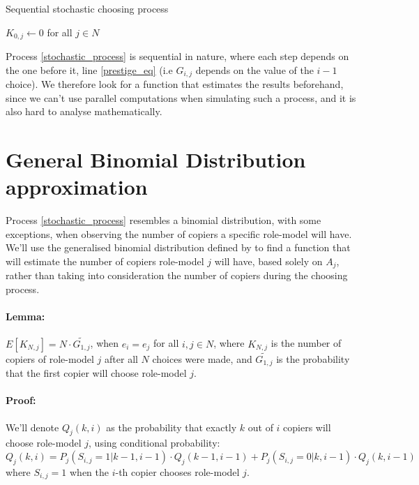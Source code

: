 \documentclass[11pt]{article}
\newenvironment{process}[1][htb]
  {\renewcommand{\algorithmcfname}{Process}%
   \begin{algorithm}[#1]%
  }{\end{algorithm}}
\begin{document}
\begin{process}\caption{Sequential stochastic choosing process}
\label{stochastic_process}
\DontPrintSemicolon
{}
$K_{0,j} \gets 0$  for all $j \in N$\;
\end{process}

Process \ref{stochastic_process} is sequential in nature, where each step depends on the one before it, line \ref{prestige_eq} (i.e $G_{i,j}$ depends on the value of the $i-1$ choice).
We therefore look for a function that estimates the results beforehand, since we can't use parallel computations when simulating such a process, and it is also hard to analyse mathematically.

\section*{General Binomial Distribution approximation}
Process \ref{stochastic_process} resembles a binomial distribution, with some exceptions, when observing the number of copiers a specific role-model will have.
We'll use the generalised binomial distribution defined by \citet{GBD} to find a function that will estimate the number of copiers role-model $j$ will have, based solely on $A_j$, rather than taking into consideration the number of copiers during the choosing process.
\paragraph{Lemma: } $E[K_{N,j}] = N \cdot \widetilde{G_{1,j}}$, when $e_i=e_j$ for all $i,j \in N$, where $K_{N,j}$ is the number of copiers of role-model $j$ after all $N$ choices were made,
 and $\widetilde{G_{1,j}}$ is the probability that the first copier will choose role-model $j$.
\paragraph{Proof: } We'll denote $Q_j(k,i)$ as the probability that exactly $k$ out of $i$ copiers will choose role-model $j$, using conditional probability:
\begin{equation}\label{recursive}
Q_j(k,i) = P_j(S_{i,j}=1 | k-1,i-1) \cdot Q_j(k-1,i-1) + P_j(S_{i,j} =0 | k,i-1) \cdot Q_j(k,i-1)
\end{equation}
where $S_{i,j} =1 $ when the $i$-th copier chooses role-model $j$.
\end{document}
